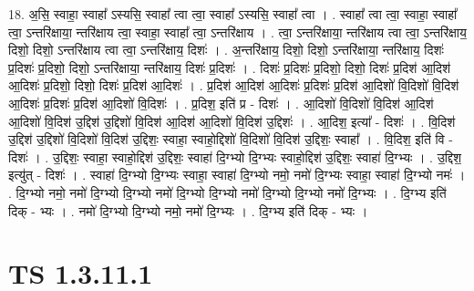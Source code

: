 \documentclass[17pt]{extarticle}
\begin{document}
18. अ॒सि॒ स्वाहा॒ स्वाहा᳚ ऽस्यसि॒ स्वाहा᳚ त्वा त्वा॒ स्वाहा᳚ ऽस्यसि॒ स्वाहा᳚ त्वा । . स्वाहा᳚ त्वा त्वा॒ स्वाहा॒ स्वाहा᳚ त्वा॒ ऽन्तरि॑क्षाया॒ न्तरि॑क्षाय त्वा॒ स्वाहा॒ स्वाहा᳚ त्वा॒ ऽन्तरि॑क्षाय । . त्वा॒ ऽन्तरि॑क्षाया॒ न्तरि॑क्षाय त्वा त्वा॒ ऽन्तरि॑क्षाय॒ दिशो॒ दिशो॒ ऽन्तरि॑क्षाय त्वा त्वा॒ ऽन्तरि॑क्षाय॒ दिशः॑ । . अ॒न्तरि॑क्षाय॒ दिशो॒ दिशो॒ ऽन्तरि॑क्षाया॒ न्तरि॑क्षाय॒ दिशः॑ प्र॒दिशः॑ प्र॒दिशो॒ दिशो॒ ऽन्तरि॑क्षाया॒ न्तरि॑क्षाय॒ दिशः॑ प्र॒दिशः॑ । . दिशः॑ प्र॒दिशः॑ प्र॒दिशो॒ दिशो॒ दिशः॑ प्र॒दिश॑ आ॒दिश॑ आ॒दिशः॑ प्र॒दिशो॒ दिशो॒ दिशः॑ प्र॒दिश॑ आ॒दिशः॑ । . प्र॒दिश॑ आ॒दिश॑ आ॒दिशः॑ प्र॒दिशः॑ प्र॒दिश॑ आ॒दिशो॑ वि॒दिशो॑ वि॒दिश॑ आ॒दिशः॑ प्र॒दिशः॑ प्र॒दिश॑ आ॒दिशो॑ वि॒दिशः॑ । . प्र॒दिश॒ इति॑ प्र - दिशः॑ । . आ॒दिशो॑ वि॒दिशो॑ वि॒दिश॑ आ॒दिश॑ आ॒दिशो॑ वि॒दिश॑ उ॒द्दिश॑ उ॒द्दिशो॑ वि॒दिश॑ आ॒दिश॑ आ॒दिशो॑ वि॒दिश॑ उ॒द्दिशः॑ । . आ॒दिश॒ इत्या᳚ - दिशः॑ । . वि॒दिश॑ उ॒द्दिश॑ उ॒द्दिशो॑ वि॒दिशो॑ वि॒दिश॑ उ॒द्दिशः॒ स्वाहा॒ स्वाहो॒द्दिशो॑ वि॒दिशो॑ वि॒दिश॑ उ॒द्दिशः॒ स्वाहा᳚ । . वि॒दिश॒ इति॑ वि - दिशः॑ । . उ॒द्दिशः॒ स्वाहा॒ स्वाहो॒द्दिश॑ उ॒द्दिशः॒ स्वाहा॑ दि॒ग्भ्यो दि॒ग्भ्यः स्वाहो॒द्दिश॑ उ॒द्दिशः॒ स्वाहा॑ दि॒ग्भ्यः । . उ॒द्दिश॒ इत्यु॑त् - दिशः॑ । . स्वाहा॑ दि॒ग्भ्यो दि॒ग्भ्यः स्वाहा॒ स्वाहा॑ दि॒ग्भ्यो नमो॒ नमो॑ दि॒ग्भ्यः स्वाहा॒ स्वाहा॑ दि॒ग्भ्यो नमः॑ । . दि॒ग्भ्यो नमो॒ नमो॑ दि॒ग्भ्यो दि॒ग्भ्यो नमो॑ दि॒ग्भ्यो दि॒ग्भ्यो नमो॑ दि॒ग्भ्यो दि॒ग्भ्यो नमो॑ दि॒ग्भ्यः । . दि॒ग्भ्य इति॑ दिक् - भ्यः । . नमो॑ दि॒ग्भ्यो दि॒ग्भ्यो नमो॒ नमो॑ दि॒ग्भ्यः । . दि॒ग्भ्य इति॑ दिक् - भ्यः । \newline
\pagebreak
{}

\section{ TS 1.3.11.1 }
\end{document}
